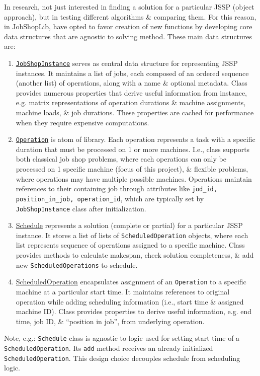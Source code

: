 \documentclass{article}
\begin{document}
\begin{itemize}
\begin{itemize}
        In research, not just interested in finding a solution for a particular JSSP (object approach), but in testing different algorithms \& comparing them. For this reason, in JobShopLib, have opted to favor creation of new functions by developing core data structures that are agnostic to solving method. These main data structures are:
        \begin{enumerate}
            \item \href{https://job-shop-lib.readthedocs.io/en/stable/api/job_shop_lib.html#job_shop_lib.JobShopInstance}{\tt JobShopInstance} serves as central data structure for representing JSSP instances. It maintains a list of jobs, each composed of an ordered sequence (another list) of operations, along with a name \& optional metadata. Class provides numerous properties that derive useful information from instance, e.g. matrix representations of operation durations \& machine assignments, machine loads, \& job durations. These properties are cached for performance when they require expensive computations.
            \item \href{https://job-shop-lib.readthedocs.io/en/stable/api/job_shop_lib.html#job_shop_lib.Operation}{\tt Operation} is atom of library. Each operation represents a task with a specific duration that must be processed on 1 or more machines. I.e., class supports both classical job shop problems, where each operations can only be processed on 1 specific machine (focus of this project), \& flexible problems, where operations may have multiple possible machines. Operations maintain references to their containing job through attributes like \verb|jod_id, position_in_job, operation_id|, which are typically set by {\tt JobShopInstance} class after initialization.
            \item \href{https://job-shop-lib.readthedocs.io/en/stable/api/job_shop_lib.html#job_shop_lib.Schedule}{Schedule} represents a solution (complete or partial) for a particular JSSP instance. It stores a list of lists of {\tt ScheduledOperation} objects, where each list represents sequence of operations assigned to a specific machine. Class provides methods to calculate makespan, check solution completeness, \& add new {\tt ScheduledOperations} to schedule.
            \item \href{https://job-shop-lib.readthedocs.io/en/stable/api/job_shop_lib.html#job_shop_lib.ScheduledOperation}{ScheduledOperation} encapsulates assignment of an {\tt Operation} to a specific machine at a particular start time. It maintains references to original operation while adding scheduling information (i.e., start time \& assigned machine ID). Class provides properties to derive useful information, e.g. end time, job ID, \& ``position in job'', from underlying operation.
        \end{enumerate}
        Note, e.g.: {\tt Schedule} class is agnostic to logic used for setting start time of a {\tt ScheduledOperation}. Its {\tt add} method receives an already initialized {\tt ScheduledOperation}. This design choice decouples schedule from scheduling logic.


\end{itemize}
\end{itemize}
\end{document}
